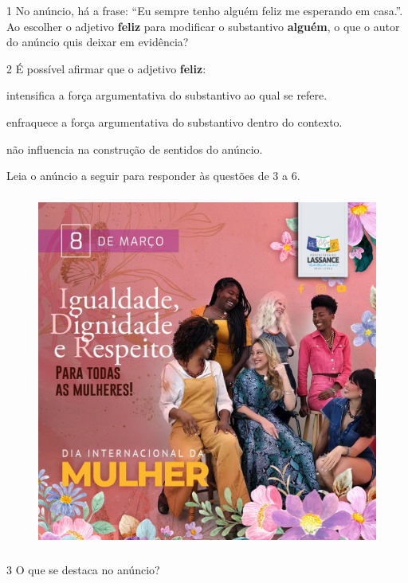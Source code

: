 \num{1} No anúncio, há a frase: ``Eu sempre tenho alguém feliz me
esperando em casa.''. Ao escolher o adjetivo \textbf{feliz} para
modificar o substantivo \textbf{alguém}, o que o autor do anúncio quis
deixar em evidência?


\num{2} É possível afirmar que o adjetivo \textbf{feliz}:

\begin{boxlist}
 intensifica a força argumentativa do substantivo ao qual se
refere.

 enfraquece a força argumentativa do substantivo dentro do contexto.

 não influencia na construção de sentidos do anúncio.
\end{boxlist}

Leia o anúncio a seguir para responder às questões de 3 a 6.


\begin{figure}
\centering
\includegraphics[width=4.61389in,height=4.61389in]{./_SAEB_9_POR/media/image20.jpeg}
\end{figure}

\num{3} O que se destaca no anúncio?


